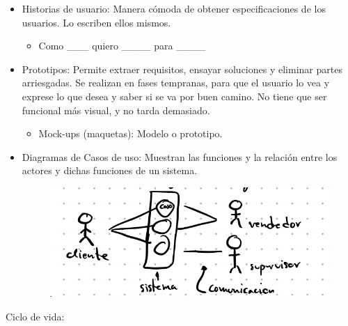 \documentclass[12pt, twoside, openright]{report} %
\begin{document}
    \begin{itemize}
		\item
		Historias de usuario: Manera cómoda de obtener especificaciones de
		los usuarios. Lo escriben ellos mismos.
			\begin{itemize}
				\item
					Como \_\_\_ quiero \_\_\_\_ para \_\_\_\_
			\end{itemize}
		\item
		Prototipos: Permite extraer requisitos, ensayar soluciones y
		eliminar partes arriesgadas. Se realizan en fases tempranas, para
		que el usuario lo vea y exprese lo que desea y saber si se va por
		buen camino. No tiene que ser funcional más visual, y no tarda
		demasiado.
			\begin{itemize}
				\item Mock-ups (maquetas): Modelo o prototipo.
			\end{itemize}
		\item
		Diagramas de Casos de uso: Muestran las funciones y la relación
		entre los actores y dichas funciones de un sistema.
		\begin{figure}[H]
			{\includegraphics[scale=.3]{Untitled 1.png}}
		\end{figure}
		

    \end{itemize}
 \pagebreak
	Ciclo de vida:
\end{document}
